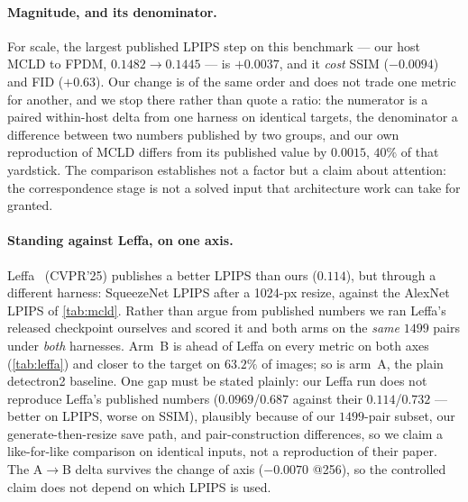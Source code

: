 \paragraph{Magnitude, and its denominator.}
For scale, the largest published LPIPS step on this benchmark --- our host MCLD to FPDM,
$0.1482\!\rightarrow\!0.1445$ --- is $+0.0037$, and it \emph{cost} SSIM ($-0.0094$) and FID
($+0.63$). Our change is of the same order and does not trade one metric for another, and we stop
there rather than quote a ratio: the numerator is a paired within-host delta from one harness on
identical targets, the denominator a difference between two numbers published by two groups, and
our own reproduction of MCLD differs from its published value by $0.0015$, $40\%$ of that
yardstick. The comparison establishes not a factor but a claim about attention: the correspondence
stage is not a solved input that architecture work can take for granted.

\paragraph{Standing against Leffa, on one axis.}
Leffa~\cite{leffa2025} (CVPR'25) publishes a better LPIPS than ours ($0.114$), but through a
different harness: SqueezeNet LPIPS after a 1024-px resize, against the AlexNet LPIPS of
\cref{tab:mcld}. Rather than argue from published numbers we ran Leffa's released checkpoint
ourselves and scored it and both arms on the \emph{same} $1499$ pairs under \emph{both} harnesses.
Arm~B is ahead of Leffa on every metric on both axes (\cref{tab:leffa}) and closer to
the target on $63.2\%$ of images; so is arm~A, the plain detectron2 baseline. One gap must be stated plainly: our Leffa run does not reproduce Leffa's published
numbers ($0.0969$/$0.687$ against their $0.114$/$0.732$ --- better on LPIPS, worse on SSIM),
plausibly because of our $1499$-pair subset, our generate-then-resize save path, and
pair-construction differences, so we claim a like-for-like comparison on identical inputs, not a
reproduction of their paper. The A$\rightarrow$B delta survives the change of axis
($-0.0070$ @256), so the controlled claim does not depend on which LPIPS is used.

